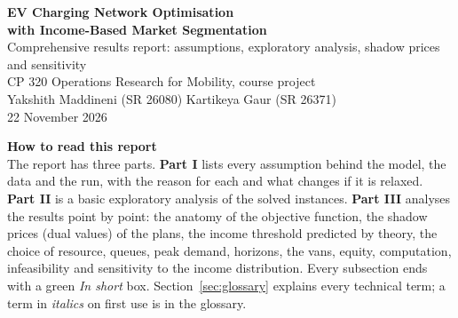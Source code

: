 \documentclass[11pt,a4paper]{article}
\begin{document}
\begin{center}
{\LARGE\bfseries\color{headblue} EV Charging Network Optimisation\\[2pt] with Income-Based Market Segmentation}\\[8pt]
{\large Comprehensive results report: assumptions, exploratory analysis, shadow prices and sensitivity}\\[6pt]
{\normalsize CP 320 Operations Research for Mobility, course project}\\[2pt]
{\normalsize Yakshith Maddineni (SR 26080) \quad\textperiodcentered\quad Kartikeya Gaur (SR 26371)}\\[2pt]
{\normalsize 22 November 2026}
\end{center}

\begin{keybox}
{\color{headblue}\textbf{How to read this report}}\\
The report has three parts. \textbf{Part I} lists every assumption behind the model, the data and the run, with the reason for each and what changes if it is relaxed. \textbf{Part II} is a basic exploratory analysis of the \NInst{} solved instances. \textbf{Part III} analyses the results point by point: the anatomy of the objective function, the shadow prices (dual values) of the plans, the income threshold predicted by theory, the choice of resource, queues, peak demand, horizons, the vans, equity, computation, infeasibility and sensitivity to the income distribution. Every subsection ends with a green \emph{In short} box. Section~\ref{sec:glossary} explains every technical term; a term in \emph{italics} on first use is in the glossary.
\end{keybox}
\end{document}
